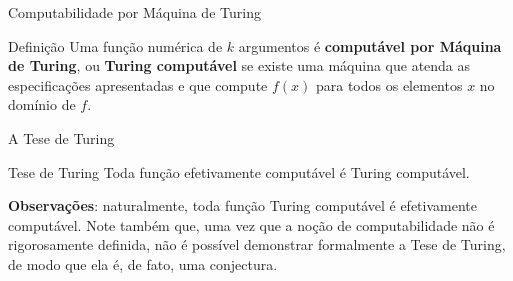 \begin{frame}[fragile]{Computabilidade por Máquina de Turing}

    \begin{block}{Definição}
        Uma função numérica de $k$ argumentos é \textbf{computável por Máquina de Turing}, ou
        \textbf{Turing computável} se existe uma máquina que atenda as especificações 
        apresentadas e que compute $f(x)$ para todos os elementos $x$ no domínio de $f$.
    \end{block}

\end{frame}

\begin{frame}[fragile]{A Tese de Turing}

    \begin{block}{Tese de Turing}
        Toda função efetivamente computável é Turing computável.
    \end{block}

    \vspace{0.2in}

    \textbf{Observações}: naturalmente, toda função Turing computável é efetivamente computável.
    Note também que, uma vez que a noção de computabilidade não é rigorosamente definida, não é
    possível demonstrar formalmente a Tese de Turing, de modo que ela é, de fato, uma conjectura.
\end{frame}
